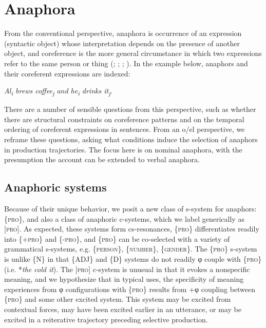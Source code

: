 \section{Anaphora}

From the conventional perspective, anaphora is occurrence of an expression (syntactic object) whose interpretation depends on the presence of another object, and coreference is the more general circumstance in which two expressions refer to the same person or thing (\citealt{HankamerSag1976}; \citealt{Huang2000}; \citealt{Reinhart1983,Reinhart2016}; \citealt{Safir2004}). In the example below, anaphors and their coreferent expressions are indexed:

    \textit{Al\textsubscript{i} brews coffee\textsubscript{j} and he\textsubscript{i} drinks it\textsubscript{j}}.

  There are a number of sensible questions from this perspective, such as whether there are structural constraints on coreference patterns and on the temporal ordering of coreferent expressions in sentences. From an o/el perspective, we reframe these questions, asking what conditions induce the selection of anaphors in production trajectories. The focus here is on nominal anaphora, with the presumption the account can be extended to verbal anaphora. 

\subsection{Anaphoric systems}

Because of their unique behavior, we posit a new class of s-system for anaphors: \{\textsc{pro}\}, and also a class of anaphoric c-systems, which we label generically as [\textsc{pro}]. As expected, these systems form cs-resonances,  \{\textsc{pro}\} differentiates readily into \{+\textsc{pro}\} and \{-\textsc{pro}\}, and \{\textsc{pro}\} can be co-selected with a variety of grammatical s-systems, e.g. \{\textsc{person}\}, \{\textsc{number}\}, \{\textsc{gender}\}. The \{\textsc{pro}\} s-system is unlike \{N\} in that \{ADJ\} and \{D\} systems do not readily φ couple with \{\textsc{pro}\} (i.e. *\textit{the cold it}). The [\textsc{pro}] c-system is unusual in that it evokes a nonspecific meaning, and we hypothesize that in typical uses, the specificity of meaning experiences from φ configurations with \{\textsc{pro}\} results from +φ coupling between \{\textsc{pro}\} and some other excited system. This system may be excited from contextual forces, may have been excited earlier in an utterance, or may be excited in a reiterative trajectory preceding selective production. 


